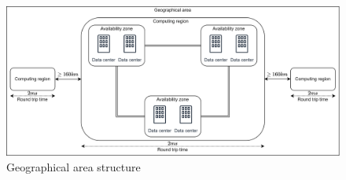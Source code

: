 \begin{figure}[H]
    \centering
    \includegraphics[width=1\linewidth]{images/computing.png}
    \caption{Geographical area structure}
\end{figure}



